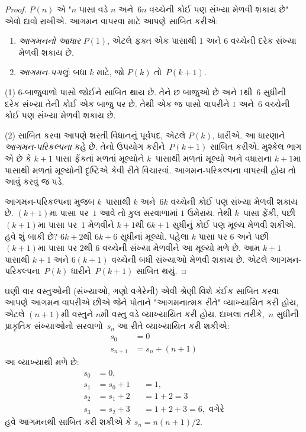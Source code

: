 \begin{proof}
$P(n)$ એ "$n$ પાસા વડે $n$ અને~$6n$ વચ્ચેની કોઈ પણ
સંખ્યા મેળવી શકાય છે" એવો દાવો રાખીએ. આગમન વાપરવા
માટે આપણે સાબિત કરીએ:
\begin{enumerate}
\item \emph{આગમનનો આધાર} $P(1)$, એટલે ફક્ત એક પાસાથી
  $1$ અને $6$ વચ્ચેની દરેક સંખ્યા મેળવી શકાય છે.
\item \emph{આગમન-પગલું}: બધા $k$ માટે, જો $P(k)$ તો~$P(k+1)$.
\end{enumerate}

(1) $6$-બાજુવાળો પાસો જોઈને સાબિત થાય છે. તેને છ બાજુઓ છે
અને $1$થી~$6$ સુધીની દરેક સંખ્યા તેની કોઈ એક બાજુ પર છે.
તેથી એક જ પાસો વાપરીને $1$ અને~$6$ વચ્ચેની કોઈ પણ સંખ્યા
મેળવી શકાય છે.

(2) સાબિત કરવા આપણે શરતી વિધાનનું પૂર્વપદ, એટલે $P(k)$,
ધારીએ. આ ધારણાને \emph{આગમન-પરિકલ્પના} કહે છે. તેનો
ઉપયોગ કરીને~$P(k+1)$ સાબિત કરીએ. મુશ્કેલ ભાગ એ છે કે
$k+1$ પાસા ફેંકતાં મળતાં મૂલ્યોને $k$~પાસાથી મળતાં
મૂલ્યો અને વધારાના $k+1$મા પાસાથી મળતાં મૂલ્યોની
દૃષ્ટિએ કેવી રીતે વિચારવાં. આગમન-પરિકલ્પના વાપરવી
હોય તો આવું કરવું જ પડે.

આગમન-પરિકલ્પના મુજબ $k$~પાસાથી $k$ અને~$6k$ વચ્ચેની
કોઈ પણ સંખ્યા મેળવી શકાય છે. $(k+1)$મા પાસા પર~$1$
આવે તો કુલ સરવાળામાં $1$ ઉમેરાય. તેથી $k$~પાસા ફેંકી,
પછી $(k+1)$મા પાસા પર~$1$ મેળવીને $k+1$થી $6k+1$
સુધીનું કોઈ પણ મૂલ્ય મેળવી શકીએ. હવે શું બાકી છે?
$6k+2$થી $6k+6$ સુધીનાં મૂલ્યો. પહેલા $k$ પાસા પર
$6$ અને પછી $(k+1)$મા પાસા પર $2$થી $6$ વચ્ચેની
સંખ્યા મેળવીને આ મૂલ્યો મળે છે. આમ $k+1$ પાસાથી
$k+1$ અને $6(k+1)$ વચ્ચેની બધી સંખ્યાઓ મેળવી શકાય છે.
એટલે આગમન-પરિકલ્પના~$P(k)$ ધારીને~$P(k+1)$ સાબિત થયું.
\end{proof}

ઘણી વાર વસ્તુઓની (સંખ્યાઓ, ગણો વગેરેની) એવી શ્રેણી
વિશે કંઈક સાબિત કરવા આપણે આગમન વાપરીએ છીએ જેને
પોતાને "આગમનાત્મક રીતે" વ્યાખ્યાયિત કરી હોય, એટલે
$(n+1)$મી વસ્તુને $n$મી વસ્તુ વડે વ્યાખ્યાયિત કરી હોય.
દાખલા તરીકે,~$n$ સુધીની પ્રાકૃતિક સંખ્યાઓનો સરવાળો~$s_n$
આ રીતે વ્યાખ્યાયિત કરી શકીએ:
\begin{align*}
  s_0 & = 0\\
  s_{n+1} & = s_n + (n+1)
\end{align*}
આ વ્યાખ્યાથી મળે છે:
\begin{align*}
  s_0 & = 0,\\
  s_1 & = s_0 + 1 && = 1,\\
  s_2 & = s_1 + 2 && = 1 + 2 = 3\\
  s_3 & = s_2 + 3 && = 1 + 2 + 3 = 6, \text{ વગેરે}
\end{align*}
હવે આગમનથી સાબિત કરી શકીએ કે $s_n = n(n+1)/2$.

